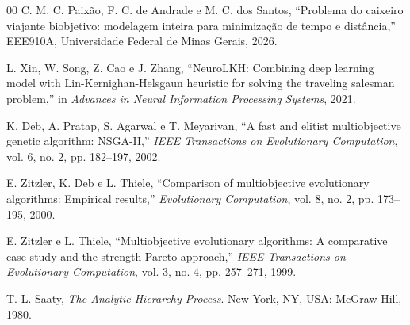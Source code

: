 \documentclass[conference]{IEEEtran}
\begin{document}
\begin{thebibliography}{00}
C. M. C. Paixão, F. C. de Andrade e M. C. dos Santos, ``Problema do
caixeiro viajante biobjetivo: modelagem inteira para minimização de tempo e
distância,'' EEE910A, Universidade Federal de Minas Gerais, 2026.

L. Xin, W. Song, Z. Cao e J. Zhang, ``NeuroLKH: Combining deep learning model
with Lin-Kernighan-Helsgaun heuristic for solving the traveling salesman
problem,'' in \emph{Advances in Neural Information Processing Systems},
2021.

K. Deb, A. Pratap, S. Agarwal e T. Meyarivan, ``A fast and elitist
multiobjective genetic algorithm: NSGA-II,'' \emph{IEEE Transactions on
Evolutionary Computation}, vol. 6, no. 2, pp. 182--197, 2002.

E. Zitzler, K. Deb e L. Thiele, ``Comparison of multiobjective
evolutionary algorithms: Empirical results,'' \emph{Evolutionary
Computation}, vol. 8, no. 2, pp. 173--195, 2000.

E. Zitzler e L. Thiele, ``Multiobjective evolutionary algorithms: A
comparative case study and the strength Pareto approach,'' \emph{IEEE
Transactions on Evolutionary Computation}, vol. 3, no. 4, pp. 257--271, 1999.

T. L. Saaty, \emph{The Analytic Hierarchy Process}. New York, NY, USA:
McGraw-Hill, 1980.
\end{thebibliography}
\end{document}
